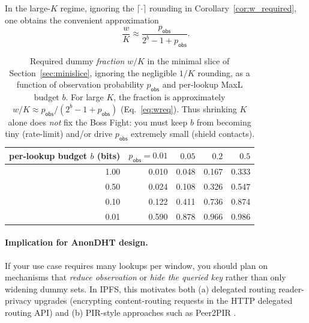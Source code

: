 \documentclass[11pt]{article}
\begin{document}
In the large-$K$ regime, ignoring the $\lceil\cdot\rceil$ rounding in Corollary~\ref{cor:w_required}, one obtains the convenient approximation
\begin{equation}
  \label{eq:wreq}
  \frac{w}{K} \approx \frac{p_{\mathsf{obs}}}{2^b - 1 + p_{\mathsf{obs}}}.
\end{equation}


\begin{table}[t]
\centering
\small
\begin{tabular}{@{}r r r r r@{}}
\toprule
per-lookup budget $b$ (bits) & $p_{\mathsf{obs}}{=}0.01$ & $0.05$ & $0.2$ & $0.5$ \\
\midrule
1.00 & 0.010 & 0.048 & 0.167 & 0.333 \\
0.50 & 0.024 & 0.108 & 0.326 & 0.547 \\
0.10 & 0.122 & 0.411 & 0.736 & 0.874 \\
0.01 & 0.590 & 0.878 & 0.966 & 0.986 \\
\bottomrule
\end{tabular}
\caption{Required dummy \emph{fraction} $w/K$ in the minimal slice of Section~\ref{sec:minislice}, ignoring the negligible $1/K$ rounding, as a function of observation probability $p_{\mathsf{obs}}$ and per-lookup MaxL budget $b$. For large $K$, the fraction is approximately $w/K\approx p_{\mathsf{obs}}/(2^b-1+p_{\mathsf{obs}})$ (Eq.~\eqref{eq:wreq}). Thus shrinking $K$ alone does \emph{not} fix the Boss Fight: you must keep $b$ from becoming tiny (rate-limit) and/or drive $p_{\mathsf{obs}}$ extremely small (shield contacts).}
\label{tab:cover_regimes}
\end{table}


\paragraph{Implication for AnonDHT design.}
If your use case requires many lookups per window, you should plan on mechanisms that \emph{reduce observation} or \emph{hide the queried key} rather than only widening dummy sets.
In IPFS, this motivates both (a) delegated routing reader-privacy upgrades (encrypting content-routing requests in the HTTP delegated routing API) \cite{ipip0421_reader_privacy,ipfs_http_routing_v1} and (b) PIR-style approaches such as Peer2PIR \cite{mazmudar2025peer2pir}.
\end{document}

